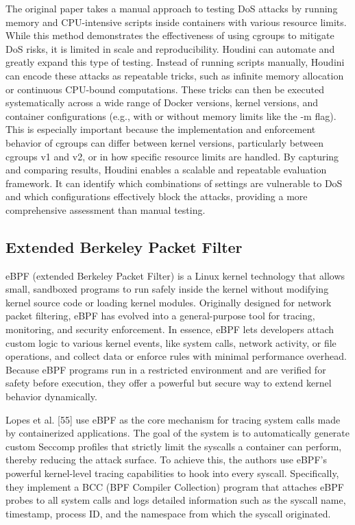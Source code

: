 \documentclass[12pt]{report}
\begin{document}
\begin{doublespace}
The original paper takes a manual approach to testing DoS attacks by running memory and CPU-intensive scripts inside containers with various resource limits. While this method demonstrates the effectiveness of using cgroups to mitigate DoS risks, it is limited in scale and reproducibility. Houdini can automate and greatly expand this type of testing. Instead of running scripts manually, Houdini can encode these attacks as repeatable tricks, such as infinite memory allocation or continuous CPU-bound computations. These tricks can then be executed systematically across a wide range of Docker versions, kernel versions, and container configurations (e.g., with or without memory limits like the -m flag). This is especially important because the implementation and enforcement behavior of cgroups can differ between kernel versions, particularly between cgroups v1 and v2, or in how specific resource limits are handled. By capturing and comparing results, Houdini enables a scalable and repeatable evaluation framework. It can identify which combinations of settings are vulnerable to DoS and which configurations effectively block the attacks, providing a more comprehensive assessment than manual testing.

\subsection{Extended Berkeley Packet Filter}


eBPF (extended Berkeley Packet Filter) is a Linux kernel technology that allows small, sandboxed programs to run safely inside the kernel without modifying kernel source code or loading kernel modules. Originally designed for network packet filtering, eBPF has evolved into a general-purpose tool for tracing, monitoring, and security enforcement. In essence, eBPF lets developers attach custom logic to various kernel events, like system calls, network activity, or file operations, and collect data or enforce rules with minimal performance overhead. Because eBPF programs run in a restricted environment and are verified for safety before execution, they offer a powerful but secure way to extend kernel behavior dynamically.


Lopes et al. [55] use eBPF as the core mechanism for tracing system calls made by containerized applications. The goal of the system is to automatically generate custom Seccomp profiles that strictly limit the syscalls a container can perform, thereby reducing the attack surface. To achieve this, the authors use eBPF's powerful kernel-level tracing capabilities to hook into every syscall. Specifically, they implement a BCC (BPF Compiler Collection) program that attaches eBPF probes to all system calls and logs detailed information such as the syscall name, timestamp, process ID, and the namespace from which the syscall originated.


\end{doublespace}
\end{document}
